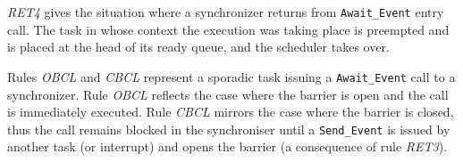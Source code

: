 
\emph{RET4} gives the situation where a synchronizer returns from
\texttt{Await\_Event} entry call. The task in whose context the
execution was taking place is preempted and is placed at the head of
its ready queue, and the scheduler takes over.


Rules \emph{OBCL} and \emph{CBCL} represent a sporadic
task issuing a \texttt{Await\_Event} call to a synchronizer. Rule
\emph{OBCL} reflects the case where the barrier is open and the call
is immediately executed. Rule \emph{CBCL} mirrors the case where 
the barrier is closed, thus the call remains blocked in the synchroniser 
until a \texttt{Send\_Event} is issued by another task (or interrupt)
and opens the barrier (a consequence of rule \emph{RET3}).

